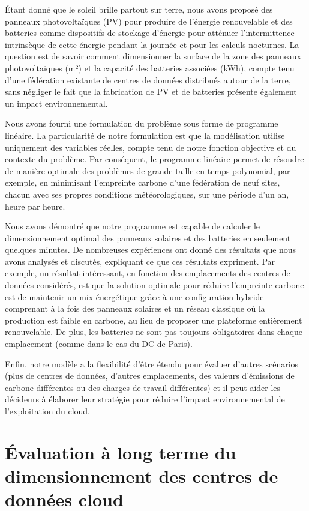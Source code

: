 Étant donné que le soleil brille partout sur terre, nous avons proposé des panneaux photovoltaïques (PV) pour produire de l'énergie renouvelable et des batteries comme dispositifs de stockage d'énergie pour atténuer l'intermittence intrinsèque de cette énergie pendant la journée et pour les calculs nocturnes. La question est de savoir comment dimensionner la surface de la zone des panneaux photovoltaïques (m²) et la capacité des batteries associées (kWh), compte tenu d'une fédération existante de centres de données distribués autour de la terre, sans négliger le fait que la fabrication de PV et de batteries présente également un impact environnemental.


Nous avons fourni une formulation du problème sous forme de programme linéaire. La particularité de notre formulation est que la modélisation utilise uniquement des variables réelles, compte tenu de notre fonction objective et du contexte du problème. Par conséquent, le programme linéaire permet de résoudre de manière optimale des problèmes de grande taille en temps polynomial, par exemple, en minimisant l'empreinte carbone d'une fédération de neuf sites, chacun avec ses propres conditions météorologiques, sur une période d'un an, heure par heure.


Nous avons démontré que notre programme est capable de calculer le dimensionnement optimal des panneaux solaires et des batteries en seulement quelques minutes. De nombreuses expériences ont donné des résultats que nous avons analysés et discutés, expliquant ce que ces résultats expriment. Par exemple, un résultat intéressant, en fonction des emplacements des centres de données considérés, est que la solution optimale pour réduire l'empreinte carbone est de maintenir un mix énergétique grâce à une configuration hybride comprenant à la fois des panneaux solaires et un réseau classique où la production est faible en carbone, au lieu de proposer une plateforme entièrement renouvelable. De plus, les batteries ne sont pas toujours obligatoires dans chaque emplacement (comme dans le cas du DC de Paris).


Enfin, notre modèle a la flexibilité d'être étendu pour évaluer d'autres scénarios (plus de centres de données, d'autres emplacements, des valeurs d'émissions de carbone différentes ou des charges de travail différentes) et il peut aider les décideurs à élaborer leur stratégie pour réduire l'impact environnemental de l'exploitation du cloud.

\section{Évaluation à long terme du dimensionnement des centres de données cloud}


